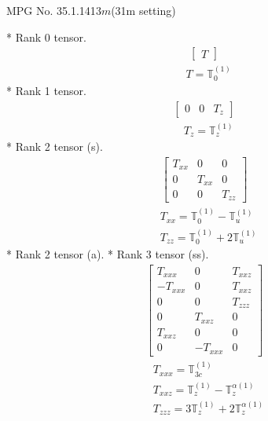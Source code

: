\documentclass[fleqn,8pt,landscape]{jsarticle}
\begin{document}
\setcounter{MaxMatrixCols}{32}

\renewcommand{\tablename}{Table~}
\renewcommand{\figurename}{Figure~}
\begin{center}
\LARGE
MPG No. 35.1.141\quad$3m$\quad(31m setting)
\end{center}
* Rank 0 tensor.
\begin{align*}
\begin{bmatrix} T \end{bmatrix}
\end{align*}
\begin{align*}
& T = \mathbb{T}_{0}^{(1)}
\end{align*}
* Rank 1 tensor.
\begin{align*}
\begin{bmatrix} 0 & 0 & T_{z} \end{bmatrix}
\end{align*}
\begin{align*}
& T_{z} = \mathbb{T}_{z}^{(1)}
\end{align*}
* Rank 2 tensor (s).
\begin{align*}
\begin{bmatrix} T_{xx} & 0 & 0 \\ 0 & T_{xx} & 0 \\ 0 & 0 & T_{zz} \end{bmatrix}
\end{align*}
\begin{align*}
& T_{xx} = \mathbb{T}_{0}^{(1)} - \mathbb{T}_{u}^{(1)} \\
& T_{zz} = \mathbb{T}_{0}^{(1)} + 2 \mathbb{T}_{u}^{(1)}
\end{align*}
* Rank 2 tensor (a).
* Rank 3 tensor (ss).
\begin{align*}
\begin{bmatrix} T_{xxx} & 0 & T_{xxz} \\ - T_{xxx} & 0 & T_{xxz} \\ 0 & 0 & T_{zzz} \\ 0 & T_{xxz} & 0 \\ T_{xxz} & 0 & 0 \\ 0 & - T_{xxx} & 0 \end{bmatrix}
\end{align*}
\begin{align*}
& T_{xxx} = \mathbb{T}_{3c}^{(1)} \\
& T_{xxz} = \mathbb{T}_{z}^{(1)} - \mathbb{T}_{z}^{\alpha(1)} \\
& T_{zzz} = 3 \mathbb{T}_{z}^{(1)} + 2 \mathbb{T}_{z}^{\alpha(1)}
\end{align*}
\end{document}
